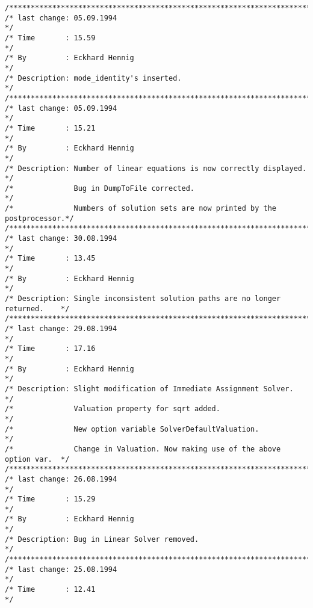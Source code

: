 \begin{verbatim}
/******************************************************************************/
/* last change: 05.09.1994                                                    */
/* Time       : 15.59                                                         */
/* By         : Eckhard Hennig                                                */
/* Description: mode_identity's inserted.                                     */
/******************************************************************************/
/* last change: 05.09.1994                                                    */
/* Time       : 15.21                                                         */
/* By         : Eckhard Hennig                                                */
/* Description: Number of linear equations is now correctly displayed.        */
/*              Bug in DumpToFile corrected.                                  */
/*              Numbers of solution sets are now printed by the postprocessor.*/
/******************************************************************************/
/* last change: 30.08.1994                                                    */
/* Time       : 13.45                                                         */
/* By         : Eckhard Hennig                                                */
/* Description: Single inconsistent solution paths are no longer returned.    */
/******************************************************************************/
/* last change: 29.08.1994                                                    */
/* Time       : 17.16                                                         */
/* By         : Eckhard Hennig                                                */
/* Description: Slight modification of Immediate Assignment Solver.           */
/*              Valuation property for sqrt added.                            */
/*              New option variable SolverDefaultValuation.                   */
/*              Change in Valuation. Now making use of the above option var.  */
/******************************************************************************/
/* last change: 26.08.1994                                                    */
/* Time       : 15.29                                                         */
/* By         : Eckhard Hennig                                                */
/* Description: Bug in Linear Solver removed.                                 */
/******************************************************************************/
/* last change: 25.08.1994                                                    */
/* Time       : 12.41                                                         */

\end{verbatim}
